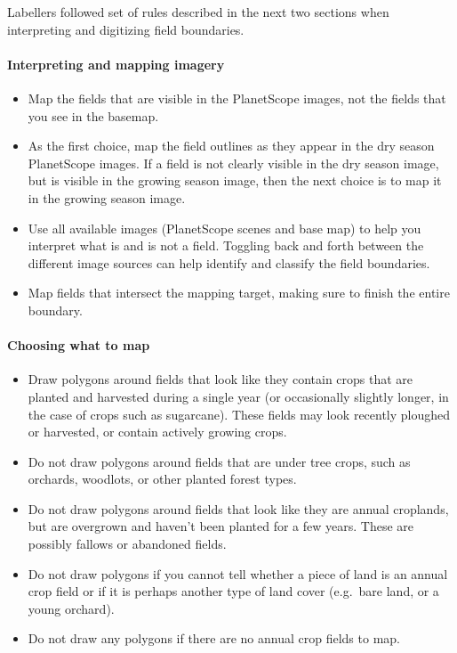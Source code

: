 \documentclass[
  11pt,
  a4paper]{article}
\begin{document}
Labellers followed set of rules described in the next two sections when
interpreting and digitizing field boundaries.

\hypertarget{interpreting-and-mapping-imagery}{%
\paragraph{Interpreting and mapping
imagery}\label{interpreting-and-mapping-imagery}}

\begin{itemize}
\item
  Map the fields that are visible in the PlanetScope images, not the
  fields that you see in the basemap.
\item
  As the first choice, map the field outlines as they appear in the dry
  season PlanetScope images. If a field is not clearly visible in the
  dry season image, but is visible in the growing season image, then the
  next choice is to map it in the growing season image.
\item
  Use all available images (PlanetScope scenes and base map) to help you
  interpret what is and is not a field. Toggling back and forth between
  the different image sources can help identify and classify the field
  boundaries.
\item
  Map fields that intersect the mapping target, making sure to finish
  the entire boundary.
\end{itemize}

\hypertarget{choosing-what-to-map}{%
\paragraph{Choosing what to map}\label{choosing-what-to-map}}

\begin{itemize}
\item
  Draw polygons around fields that look like they contain crops that are
  planted and harvested during a single year (or occasionally slightly
  longer, in the case of crops such as sugarcane). These fields may look
  recently ploughed or harvested, or contain actively growing crops.
\item
  Do not draw polygons around fields that are under tree crops, such as
  orchards, woodlots, or other planted forest types.
\item
  Do not draw polygons around fields that look like they are annual
  croplands, but are overgrown and haven't been planted for a few years.
  These are possibly fallows or abandoned fields.
\item
  Do not draw polygons if you cannot tell whether a piece of land is an
  annual crop field or if it is perhaps another type of land cover
  (e.g.~bare land, or a young orchard).
\item
  Do not draw any polygons if there are no annual crop fields to map.
\end{itemize}
\end{document}
